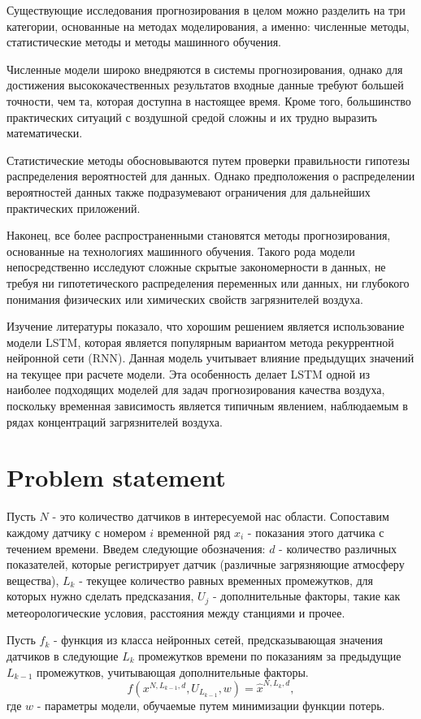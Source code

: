 \documentclass{article}
\begin{document}
Существующие исследования прогнозирования в целом можно разделить на три категории, основанные на методах моделирования, а именно: численные методы, статистические методы и методы машинного обучения. 

Численные модели широко внедряются в системы прогнозирования, однако для достижения высококачественных результатов входные данные требуют большей точности, чем та, которая доступна в настоящее время. Кроме того, большинство практических ситуаций с воздушной средой сложны и их трудно выразить математически. 

Статистические методы обосновываются путем проверки правильности гипотезы распределения вероятностей для данных. Однако предположения о распределении вероятностей данных также подразумевают ограничения для дальнейших практических приложений.

Наконец, все более распространенными становятся методы прогнозирования, основанные на технологиях машинного обучения. Такого рода модели непосредственно исследуют сложные скрытые закономерности в данных, не требуя ни гипотетического распределения переменных или данных, ни глубокого понимания физических или химических свойств загрязнителей воздуха.

Изучение литературы показало, что хорошим решением является использование модели LSTM, которая является популярным вариантом метода рекуррентной нейронной сети (RNN). Данная модель учитывает влияние предыдущих значений на текущее при расчете модели. Эта особенность делает LSTM одной из наиболее подходящих моделей для задач прогнозирования качества воздуха, поскольку временная зависимость является типичным явлением, наблюдаемым в рядах концентраций загрязнителей воздуха. 

\section{Problem statement}
Пусть $N$ - это количество датчиков в интересуемой нас области. Сопоставим каждому датчику с номером $i$ временной ряд $x_i$ - показания этого датчика с течением времени. Введем следующие обозначения: $d$ - количество различных показателей, которые регистрирует датчик (различные загрязняющие атмосферу вещества), $L_k$ - текущее количество равных временных промежутков, для которых нужно сделать предсказания, $U_j$ - дополнительные факторы, такие как метеорологические условия, расстояния между станциями и прочее. 

Пусть $f_k$ - функция из класса нейронных сетей, предсказывающая значения датчиков в следующие $L_k$ промежутков времени по показаниям за предыдущие $L_{k-1}$ промежутков, учитывающая дополнительные факторы. 
$$ f(x^{N, L_{k-1}, d}, U_{L_{k-1}}, w) = \hat{x}^{N, L_k, d}, $$ где $w$ - параметры модели, обучаемые путем минимизации функции потерь. 




\end{document}
